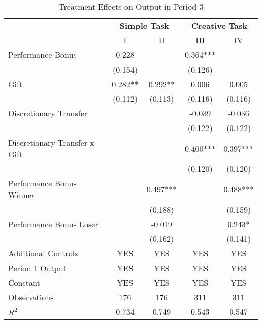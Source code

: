 \begin{table}[h]%
\captionsetup{justification=centering}
\setlength\tabcolsep{2pt}
\caption{Treatment Effects on Output in Period 3}
\begin{center}%
{\small\renewcommand{\arraystretch}{1}%
\begin{tabular}{lcccc}
\hline\noalign{\smallskip}
 & \multicolumn{2}{c}{\bf Simple Task} & \multicolumn{2}{c}{\bf Creative Task} \\
 & I & II & III & IV \\
\hline\noalign{\smallskip}
Performance Bonus   &       0.228   &               &       0.364***&               \\
                    &     (0.154)   &               &     (0.126)   &               \\[2mm]
Gift                &       0.282** &       0.292** &       0.006   &       0.005   \\
                    &     (0.112)   &     (0.113)   &     (0.116)   &     (0.116)   \\[2mm]
Discretionary Transfer&               &               &      -0.039   &      -0.036   \\
                    &               &               &     (0.122)   &     (0.122)   \\
Discretionary Transfer x Gift&               &               &       0.400***&       0.397***\\
                    &               &               &     (0.120)   &     (0.120)   \\
Performance Bonus Winner&               &       0.497***&               &       0.488***\\
                    &               &     (0.188)   &               &     (0.159)   \\
Performance Bonus Loser&               &      -0.019   &               &       0.243*  \\
                    &               &     (0.162)   &               &     (0.141)   \\
\noalign{\smallskip}\hline
 Additional Controls  & YES & YES & YES & YES \\
 Period 1 Output  & YES & YES & YES & YES \\
 Constant & YES & YES & YES & YES \\
\hline
Observations        &         176   &         176   &         311   &         311   \\
$R^2$               &       0.734   &       0.749   &       0.543   &       0.547   \\

\end{tabular}}
\end{center}
\end{table}

